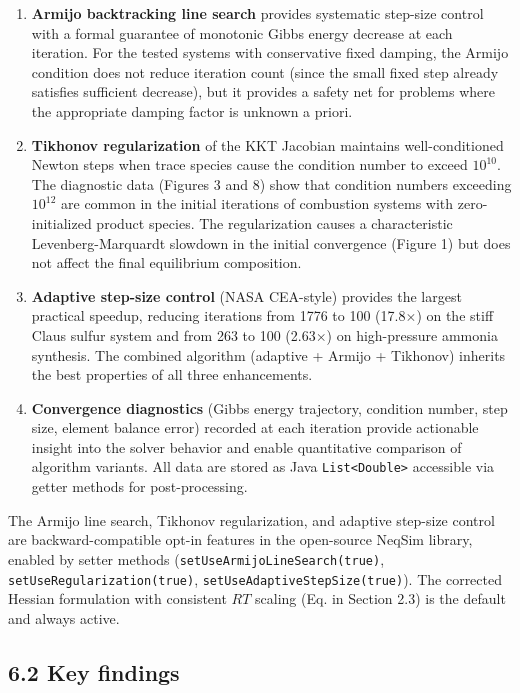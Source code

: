 \documentclass[review,3p]{elsarticle}
\begin{document}
\begin{enumerate}
  \item \textbf{Armijo backtracking line search} provides systematic step-size control with a formal guarantee of monotonic Gibbs energy decrease at each iteration. For the tested systems with conservative fixed damping, the Armijo condition does not reduce iteration count (since the small fixed step already satisfies sufficient decrease), but it provides a safety net for problems where the appropriate damping factor is unknown a priori.

  \item \textbf{Tikhonov regularization} of the KKT Jacobian maintains well-conditioned Newton steps when trace species cause the condition number to exceed $10^{10}$. The diagnostic data (Figures 3 and 8) show that condition numbers exceeding $10^{12}$ are common in the initial iterations of combustion systems with zero-initialized product species. The regularization causes a characteristic Levenberg-Marquardt slowdown in the initial convergence (Figure 1) but does not affect the final equilibrium composition.

  \item \textbf{Adaptive step-size control} (NASA CEA-style) provides the largest practical speedup, reducing iterations from 1776 to 100 (17.8$\times$) on the stiff Claus sulfur system and from 263 to 100 (2.63$\times$) on high-pressure ammonia synthesis. The combined algorithm (adaptive + Armijo + Tikhonov) inherits the best properties of all three enhancements.

  \item \textbf{Convergence diagnostics} (Gibbs energy trajectory, condition number, step size, element balance error) recorded at each iteration provide actionable insight into the solver behavior and enable quantitative comparison of algorithm variants. All data are stored as Java \texttt{List<Double>} accessible via getter methods for post-processing.
\end{enumerate}

The Armijo line search, Tikhonov regularization, and adaptive step-size control are backward-compatible opt-in features in the open-source NeqSim library, enabled by setter methods (\texttt{setUseArmijoLineSearch(true)}, \texttt{setUseRegularization(true)}, \texttt{setUseAdaptiveStepSize(true)}). The corrected Hessian formulation with consistent $RT$ scaling (Eq. in Section 2.3) is the default and always active.

\subsection{6.2 Key findings}
\end{document}
